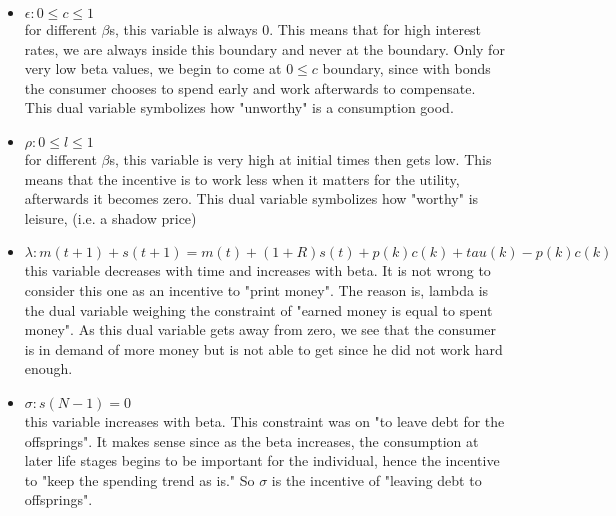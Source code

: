 \begin{itemize}
\item $\epsilon: 0\leq c \leq 1$ \\

for different $\beta$s, this variable is always 0. This means that for high interest rates, we are always inside this boundary and never at the boundary. Only for very low  beta values, we begin to come at $0\leq c$ boundary, since with bonds the consumer chooses to spend early and work afterwards to compensate. This dual variable symbolizes how "unworthy" is a consumption good. 

\item $\rho: 0\leq l \leq 1$ \\

for different $\beta$s, this variable is very high at initial times then gets low. This means that the incentive is to work less when it matters for the utility, afterwards it becomes zero. This dual variable symbolizes how "worthy" is leisure, (i.e. a shadow price) 

\item $\lambda: m(t+1) + s(t+1) = m(t) + (1+R)s(t) + p(k)c(k) + tau(k) - p(k)c(k)$\\

this variable decreases with time and increases with beta. It is not wrong to consider this one as an incentive to "print money". The reason is, lambda is the dual variable weighing the constraint of "earned money is equal to spent money". As this dual variable gets away from zero, we see that the consumer is in demand of more money but is not able to get since he did not work hard enough.

\item $\sigma: s(N-1)=0 $\\

this variable increases with beta. This constraint was on "to leave debt for the offsprings". It makes sense since as the beta increases, the consumption at later life stages begins to be important for the individual, hence the incentive to "keep the spending trend as is." So $\sigma$ is the incentive of "leaving debt to offsprings".

\end{itemize}